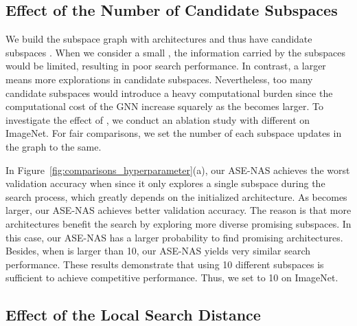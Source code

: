 \documentclass[lettersize,journal]{IEEEtran}
\newcommand{\sexyname}{ASE-NAS\xspace}
\begin{document}
\begin{figure*}[!t]
\centering
{}
\hfil
{}
\caption{Comparisons of the search performance with the different numbers of candidate subspaces  (a) and the different local search distance  (b) on ImageNet.}
\label{fig:comparisons_hyperparameter}
\end{figure*}


\subsection{Effect of the Number of Candidate Subspaces }\label{sec:ablation_on_K}

We build the subspace graph with  architectures and thus have  candidate subspaces .
When we consider a small , the information carried by the subspaces would be limited, resulting in poor search performance.
In contrast, a larger  means more explorations in candidate subspaces.
Nevertheless, too many candidate subspaces would introduce a heavy computational burden since the computational cost of the GNN increase squarely as the  becomes larger.
To investigate the effect of , we conduct an ablation study with different  on ImageNet.
For fair comparisons, we set the number of each subspace updates in the graph to the same.

In Figure~\ref{fig:comparisons_hyperparameter}(a), our \sexyname achieves the worst validation accuracy when  since it only explores a single subspace during the search process, which greatly depends on the initialized architecture.
As  becomes larger, our \sexyname achieves better validation accuracy.
The reason is that more architectures benefit the search by exploring more diverse promising subspaces.
In this case, our \sexyname has a larger probability to find promising architectures.
Besides, when  is larger than 10, our \sexyname yields very similar search performance.
These results demonstrate that using 10 different subspaces is sufficient to achieve competitive performance.
Thus, we set  to 10 on ImageNet.


\subsection{Effect of the Local Search Distance }\label{sec:ablation_on_M}
\end{document}
